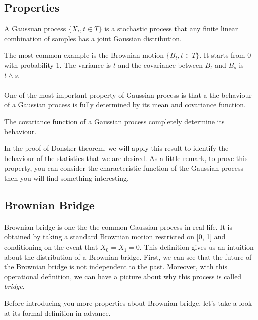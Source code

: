 \documentclass[project2.tex]{subfiles}
\begin{document}
\subsection{Properties}

\begin{definition}
A Gaussuan process $\{X_t,t\in T\}$ is a stochastic process that any finite linear combination of samples has a joint Gaussian distribution.
\end{definition}
The most common example is the Brownian motion $\{B_t,t\in T\}$. It starts from 0 with probability 1. The variance is $t$ and the covariance between $B_t$ and $B_s$ is $t\wedge s$.
\paragraph{}
One of the most important property of Gaussian process is that a the behaviour of a Gaussian process is fully determined by its mean and covariance function.
\begin{property}
The covariance function of a Gaussian process completely determine its behaviour.
\end{property}
In the proof of Donsker theorem, we will apply this result to identify the behaviour of the statistics that we are desired. As a little remark, to prove this property, you can consider the characteristic function of the Gaussian process then you will find something interesting.

\subsection{Brownian Bridge}

\paragraph{}
Brownian bridge is one the the common Gaussian process in real life. It is obtained by taking a standard Brownian motion restricted on [0, 1] and conditioning on the event that $X_0 = X_1=0$. This definition gives us an intuition about the distribution of a Brownian bridge. First, we can see that the future of the Brownian bridge is not independent to the past. Moreover, with this operational definition, we can have a picture about why this process is called {\it bridge}.

Before introducing you more properties about Brownian bridge, let's take a look at its formal definition in advance.
\end{document}
